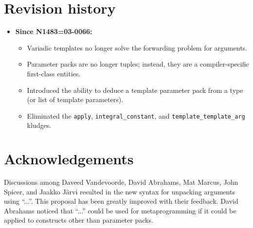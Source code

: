 \documentclass{article}
\begin{document}
\section{Revision history}
\begin{itemize}
\item \textbf{Since N1483=03-0066:} 
  \begin{itemize}
  \item Variadic templates no longer solve the forwarding problem for
    arguments. 
  \item Parameter packs are no longer tuples; instead, they are a
    compiler-specific first-class entities.
  \item Introduced the ability to deduce a template parameter pack
    from a type (or list of template parameters).
  \item Eliminated the \texttt{apply}, \texttt{integral\_constant},
    and \texttt{template\_template\_arg} kludges.
  \end{itemize}
\end{itemize}

\section{Acknowledgements}
Discussions among Daveed Vandevoorde, David Abrahams, Mat Marcus, John
Spicer, and Jaakko J\"arvi resulted in the new syntax for unpacking
arguments using ``...''. This proposal has been greatly improved with
their feedback. David Abrahams noticed that ``...''  could be used for
metaprogramming if it could be applied to constructs other than
parameter packs.



\end{document}
